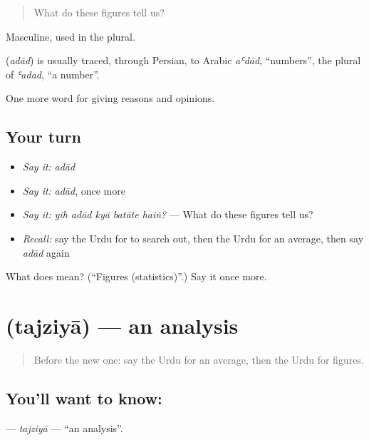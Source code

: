 \begin{quote}
What do these figures tell us?
\end{quote}

Masculine, used in the plural.

\begin{cousinweb}
\textbf{} (\emph{adād}) is usually traced, through Persian, to Arabic \emph{aʿdād}, \textquotedblleft{}numbers\textquotedblright{}, the plural of \emph{ʿadad}, \textquotedblleft{}a number\textquotedblright{}.
\end{cousinweb}

\begin{grammarlens}[title={What you've built}]
One more word for giving reasons and opinions.
\end{grammarlens}

\subsection*{Your turn}
\begin{itemize}
\raggedright
  \item \emph{Say it:} \emph{adād}
  \item \emph{Say it:} \emph{adād}, once more
  \item \emph{Say it:} \emph{yih adād kyā batāte haiṅ?} — What do these figures tell us?
  \item \emph{Recall:} say the Urdu for to search out, then the Urdu for an average, then say \emph{adād} again
\end{itemize}

\begin{tcolorbox}[breakable,colback=teal!4,colframe=teal!35!black,title={Before you move on}]
What does  mean? (\textquotedblleft{}Figures (statistics)\textquotedblright{}.) Say it once more.
\end{tcolorbox}
\section[\texorpdfstring{\ur{تجزیہ} (tajziyā)}{تجزیہ (tajziyā)}]{ (tajziyā) — an analysis}

\label{lesson:UR-C350-tajziya}



\begin{quote}
Before the new one: say the Urdu for an average, then the Urdu for figures.
\end{quote}

\subsection*{You'll want to know: }
\textbf{} — \emph{tajziyā} — \textquotedblleft{}an analysis\textquotedblright{}.


